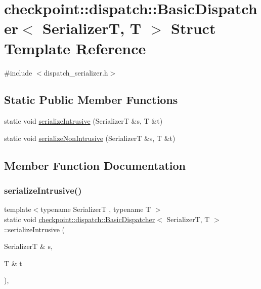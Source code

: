 \hypertarget{structcheckpoint_1_1dispatch_1_1_basic_dispatcher}{}\section{checkpoint\+:\+:dispatch\+:\+:Basic\+Dispatcher$<$ SerializerT, T $>$ Struct Template Reference}
\label{structcheckpoint_1_1dispatch_1_1_basic_dispatcher}


{\ttfamily \#include $<$dispatch\+\_\+serializer.\+h$>$}

\subsection*{Static Public Member Functions}
\begin{DoxyCompactItemize}
\item 
static void \hyperlink{structcheckpoint_1_1dispatch_1_1_basic_dispatcher_a17b171451a710c8ca2eab6d303eb2a62}{serialize\+Intrusive} (SerializerT \&s, T \&t)
\item 
static void \hyperlink{structcheckpoint_1_1dispatch_1_1_basic_dispatcher_a795cda635c3b27b205a861cbba9d5384}{serialize\+Non\+Intrusive} (SerializerT \&s, T \&t)
\end{DoxyCompactItemize}


\subsection{Member Function Documentation}
\mbox{\label{structcheckpoint_1_1dispatch_1_1_basic_dispatcher_a17b171451a710c8ca2eab6d303eb2a62}} 
\subsubsection{\texorpdfstring{serialize\+Intrusive()}{serializeIntrusive()}}
{\footnotesize\ttfamily template$<$typename SerializerT , typename T $>$ \\
static void \hyperlink{structcheckpoint_1_1dispatch_1_1_basic_dispatcher}{checkpoint\+::dispatch\+::\+Basic\+Dispatcher}$<$ SerializerT, T $>$\+::serialize\+Intrusive (\begin{DoxyParamCaption}\item[{SerializerT \&}]{s,  }\item[{T \&}]{t }\end{DoxyParamCaption})\hspace{0.3cm}{\ttfamily [inline]}, {\ttfamily [static]}}

